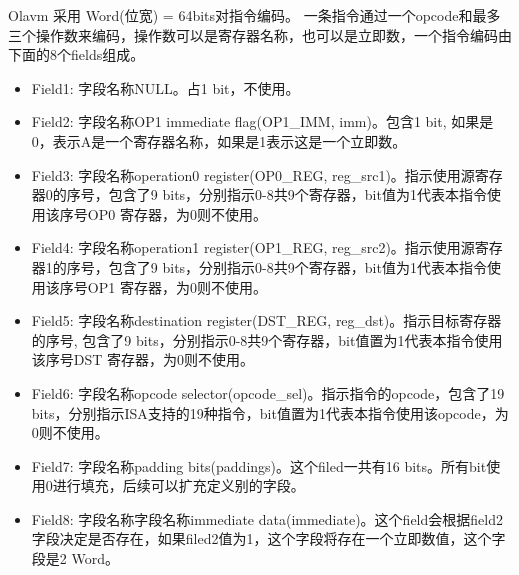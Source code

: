 Olavm 采用 Word(位宽) = 64bits对指令编码。
一条指令通过一个opcode和最多三个操作数来编码，操作数可以是寄存器名称，也可以是立即数，一个指令编码由下面的8个fields组成。
\begin{itemize}
    \item Field1: 字段名称NULL。占1 bit，不使用。
    \item Field2: 字段名称OP1 immediate flag(OP1\_IMM, imm)。包含1 bit, 如果是0，表示A是一个寄存器名称，如果是1表示这是一个立即数。
    \item Field3: 字段名称operation0 register(OP0\_REG, reg\_src1)。指示使用源寄存器0的序号，包含了9 bits，分别指示0-8共9个寄存器，bit值为1代表本指令使用该序号OP0 寄存器，为0则不使用。
    \item Field4: 字段名称operation1 register(OP1\_REG, reg\_src2)。指示使用源寄存器1的序号，包含了9 bits，分别指示0-8共9个寄存器，bit值为1代表本指令使用该序号OP1 寄存器，为0则不使用。
    \item Field5: 字段名称destination register(DST\_REG, reg\_dst)。指示目标寄存器的序号, 包含了9 bits，分别指示0-8共9个寄存器，bit值置为1代表本指令使用该序号DST 寄存器，为0则不使用。
    \item Field6: 字段名称opcode selector(opcode\_sel)。指示指令的opcode，包含了19 bits，分别指示ISA支持的19种指令，bit值置为1代表本指令使用该opcode，为0则不使用。
    \item Field7: 字段名称padding bits(paddings)。这个filed一共有16 bits。所有bit使用0进行填充，后续可以扩充定义别的字段。
    \item Field8: 字段名称字段名称immediate data(immediate)。这个field会根据field2字段决定是否存在，如果filed2值为1，这个字段将存在一个立即数值，这个字段是2 Word。
\end{itemize}

